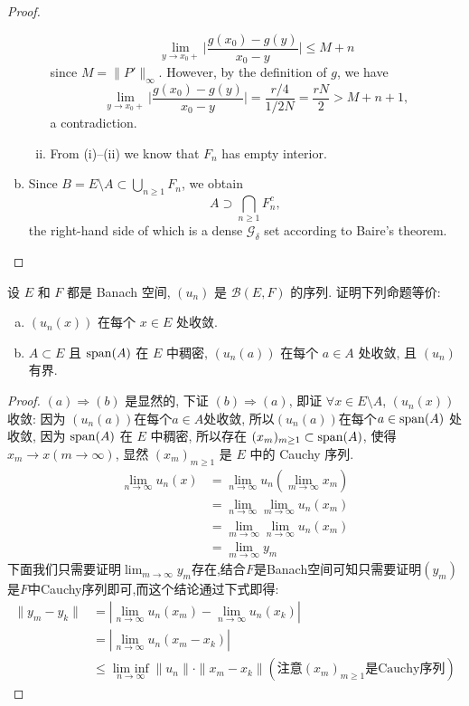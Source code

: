 \begin{proof}
\begin{enumerate}[(a)]
\begin{enumerate}[(i)]
          \[\lim_{y\to x_0+} \biggl|\frac{g(x_0)-g(y)}{x_0-y}\biggr| \leq M+n\]
          since $M = \|P'\|_\infty$. However, by the definition of $g$, we have
          \[\lim_{y\to x_0+} \biggl|\frac{g(x_0)-g(y)}{x_0-y}\biggr|
            = \frac{r/4}{1/2N} = \frac{rN}{2} > M + n + 1,\]
          a contradiction.
        \item From (i)--(ii) we know that $F_n$ has empty interior.
      \end{enumerate}
    \item Since $B = E\setminus A \subset \bigcup_{n\geq 1} F_n$, we obtain
      \[A \supset \bigcap_{n\geq 1} F_n^c,\]
      the right-hand side of which is a dense $\mathcal{G}_\delta$ set according to
      Baire's theorem. \qedhere
  \end{enumerate}
\end{proof}


\begin{exercise}
  设 $E$ 和 $F$ 都是 Banach 空间, $(u_n)$ 是 $\mathcal{B}(E,F)$ 的序列.
  证明下列命题等价:
  \begin{enumerate}[(a)]
    \item $(u_n(x))$ 在每个 $x\in E$ 处收敛.
    \item $A\subset E$ 且 $\operatorname{span}(A)$ 在 $E$ 中稠密, $(u_n(a))$ 在每个 $a\in A$ 处收敛,
    且 $(u_n)$ 有界.
  \end{enumerate}
\end{exercise}

\begin{proof}
    $(a)\Rightarrow(b)$ 是显然的, 下证 $(b)\Rightarrow(a)$,
    即证 $\forall x\in E\setminus A$, $(u_n(x))$ 收敛:
    因为 $(u_n(a))$在每个$a\in A$处收敛, 所以$(u_n(a))$在每个$a\in\operatorname{span}(A)$ 处收敛,
    因为 $\operatorname{span}(A)$ 在 $E$ 中稠密, 所以存在 $(x_m)_{m\geq1}\subset\operatorname{span}(A)$,
    使得 $x_m\to x(m\to\infty)$, 显然 $(x_m)_{m\geq1}$ 是 $E$ 中的 Cauchy 序列. 
    \[\begin{split}
    \lim_{n\to\infty}u_n(x)
    &=\lim_{n\to\infty}u_n\left(\lim_{m\to\infty}x_m\right)\\
    &=\lim_{n\to\infty}\lim_{m\to\infty}u_n(x_m)\\
    &=\lim_{m\to\infty}\lim_{n\to\infty}u_n(x_m)\\
    &=\lim_{m\to\infty}y_m\end{split}\]
    下面我们只需要证明$\lim_{m\to\infty}y_m$存在,结合$F$是Banach空间可知只需要证明$(y_m)$是$F$中Cauchy序列即可,而这个结论通过下式即得:
    \[\begin{split}
    \|y_m-y_k\|
    &=|\lim_{n\to\infty}u_n(x_m)-\lim_{n\to\infty}u_n(x_k)|\\
    &=|\lim_{n\to\infty}u_n(x_m-x_k)|\\
    &\leq\mathop{\textrm{lim inf}}\limits_{n\to\infty}\|u_n\|\cdot\|x_m-x_k\|\left(\mbox{注意}(x_m)_{m\geq1}\mbox{是}\mathrm{Cauchy}\mbox{序列}\right)
    \end{split}\]
\end{proof}


